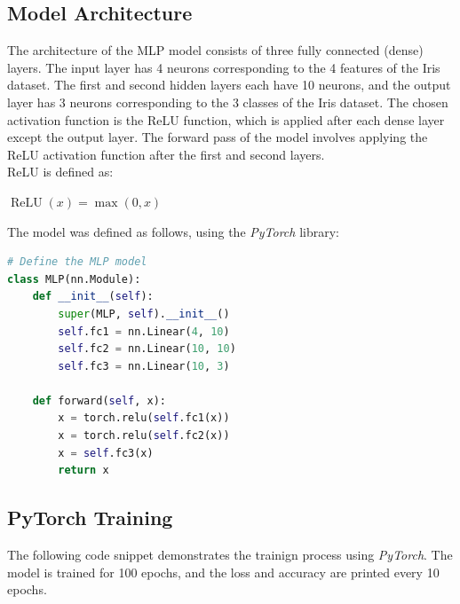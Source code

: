 \documentclass{article}
\begin{document}
\subsection{Model Architecture}
The architecture of the MLP model consists of three fully connected (dense) layers.
The input layer has 4 neurons corresponding to the 4 features of the Iris dataset. 
The first and second hidden layers each have 10 neurons, and the output layer has 3 neurons corresponding to the 3 classes of the Iris dataset.
The chosen activation function is the ReLU function, which is applied after each dense layer except the output layer.
The forward pass of the model involves applying the ReLU activation function after the first and second layers.
\\ReLU is defined as:
\begin{center}
$\operatorname{ReLU}(x) = \max(0, x)$
\end{center}
The model was defined as follows, using the \textit{PyTorch} library:
\begin{lstlisting}[language=Python]
# Define the MLP model
class MLP(nn.Module):
    def __init__(self):
        super(MLP, self).__init__()
        self.fc1 = nn.Linear(4, 10)
        self.fc2 = nn.Linear(10, 10)
        self.fc3 = nn.Linear(10, 3)
    
    def forward(self, x):
        x = torch.relu(self.fc1(x))
        x = torch.relu(self.fc2(x))
        x = self.fc3(x)
        return x
\end{lstlisting}


\subsection{PyTorch Training}
The following code snippet demonstrates the trainign process using \textit{PyTorch}. The model is trained for 100 epochs, and the loss and accuracy are printed every 10 epochs.
\end{document}

